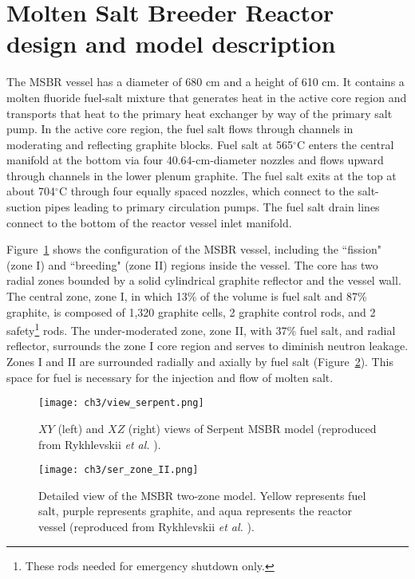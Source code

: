 \section{Molten Salt Breeder Reactor design and model description}
The \gls{MSBR} vessel has a diameter of 680 cm and a height of 610 cm. It 
contains a molten fluoride fuel-salt mixture that generates heat in the active 
core region and transports that heat to the primary heat exchanger by way of 
the primary salt pump. In the active core region, the fuel salt flows through 
channels in moderating and reflecting graphite blocks. Fuel salt at 
565$^{\circ}$C enters the central manifold at the bottom via four  
40.64-cm-diameter nozzles and flows upward through channels in the lower 
plenum graphite. The fuel salt exits at the top at about 704$^{\circ}$C 
through four equally spaced nozzles, which connect to the salt-suction pipes 
leading to primary circulation pumps. The fuel salt drain lines connect to the 
bottom of the reactor vessel inlet manifold.

Figure~\ref{fig:serpent_plan_view} shows the configuration of the \gls{MSBR} 
vessel, including the ``fission" (zone I) and ``breeding" (zone II) regions 
inside the vessel. The core has two radial zones bounded by a solid  
cylindrical graphite reflector and the vessel wall. The central zone, zone I, 
in which 13\% of the volume is fuel salt and 87\% graphite, is composed of 
1,320 graphite cells, 2 graphite control rods, and 2 safety\footnote{ These 
rods needed for emergency shutdown only.} rods. The under-moderated zone, zone 
II, with 37\% fuel salt, and radial reflector, surrounds the zone I core 
region and serves to diminish neutron leakage. Zones I and II are surrounded 
radially and axially by fuel salt (Figure~\ref{fig:serpent_zoneII}). This 
space for fuel is necessary for the injection and flow of molten salt.
\begin{figure}[t] %
	\texttt{[image: ch3/view\_serpent.png]}
	\caption{$XY$ (left) and $XZ$ (right) views of Serpent \gls{MSBR} model 
	(reproduced from Rykhlevskii \emph{et al.} 
	\cite{rykhlevskii_modeling_2019}).}
	\label{fig:serpent_plan_view}
\end{figure}

\begin{figure}[t!] %
	\texttt{[image: ch3/ser\_zone\_II.png]}
	\caption{Detailed view of the \gls{MSBR} two-zone model. 
		Yellow represents fuel salt, purple represents graphite, and aqua 
		represents the reactor vessel (reproduced from Rykhlevskii 
		\emph{et al.} \cite{rykhlevskii_modeling_2019}).}
	\label{fig:serpent_zoneII}
\end{figure}

